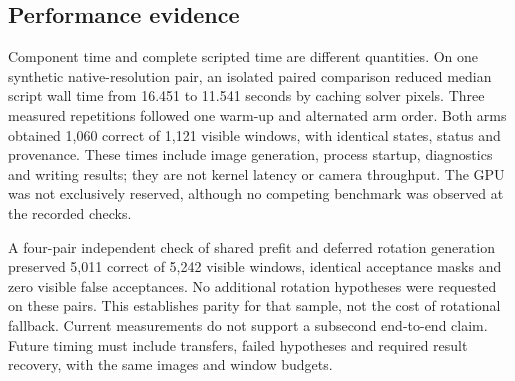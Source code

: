 \subsection{Performance evidence}
Component time and complete scripted time are different quantities. On one synthetic native-resolution pair, an isolated paired comparison reduced median script wall time from 16.451 to 11.541 seconds by caching solver pixels. Three measured repetitions followed one warm-up and alternated arm order. Both arms obtained 1,060 correct of 1,121 visible windows, with identical states, status and provenance. These times include image generation, process startup, diagnostics and writing results; they are not kernel latency or camera throughput. The GPU was not exclusively reserved, although no competing benchmark was observed at the recorded checks.

A four-pair independent check of shared prefit and deferred rotation generation preserved 5,011 correct of 5,242 visible windows, identical acceptance masks and zero visible false acceptances. No additional rotation hypotheses were requested on these pairs. This establishes parity for that sample, not the cost of rotational fallback. Current measurements do not support a subsecond end-to-end claim. Future timing must include transfers, failed hypotheses and required result recovery, with the same images and window budgets.

